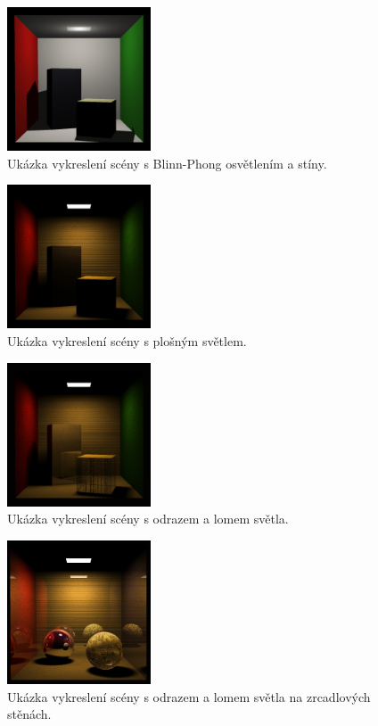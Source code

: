 \documentclass[10pt,a4paper,twocolumn]{article}
\begin{document}
\begin{figure}[H]
    \centering
    \includegraphics[width=0.38\textwidth]{images/box_render_blinn-phong_shadows.png}
    \caption{Ukázka vykreslení scény s Blinn-Phong osvětlením a stíny.}
\end{figure}

\begin{figure}[H]
    \centering
    \includegraphics[width=0.38\textwidth]{images/box_render_area_lights.png}
    \caption{Ukázka vykreslení scény s plošným světlem.}
\end{figure}

\begin{figure}[H]
    \centering
    \includegraphics[width=0.38\textwidth]{images/box_render_reflection_refraction.png}
    \caption{Ukázka vykreslení scény s odrazem a lomem světla.}
\end{figure}

\begin{figure}[H]
    \centering
    \includegraphics[width=0.38\textwidth]{images/sphere_render_reflection_refraction_walls.png}
    \caption{Ukázka vykreslení scény s odrazem a lomem světla na zrcadlových stěnách.}
\end{figure}
\end{document}
